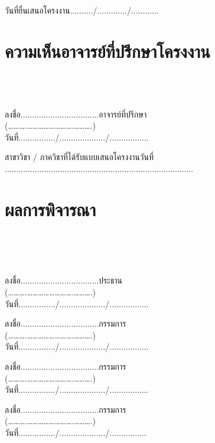 \documentclass[12pt,a4paper]{article}
\begin{document}
\vspace{1cm}
วันที่ยื่นเสนอโครงงาน........../............./............

\vspace{2cm}

\section*{ความเห็นอาจารย์ที่ปรึกษาโครงงาน}
\dotfill\\
\dotfill\\
\dotfill\\

\vspace{1cm}
ลงชื่อ..................................อาจารย์ที่ปรึกษา\\
(……….…………………….……….)\\
วันที่................/..................../.................

\vspace{1cm}
สาขาวิชา / ภาควิชาที่ได้รับแบบเสนอโครงงานวันที่ ..................................................................................

\vspace{1cm}

\section*{ผลการพิจารณา}
\dotfill\\
\dotfill\\
\dotfill\\

\vspace{1cm}

\begin{minipage}{0.5\textwidth}
ลงชื่อ..................................ประธาน\\
(……….…………………….……….)\\
วันที่................/..................../.................

\vspace{1cm}

ลงชื่อ..................................กรรมการ\\
(……….…………………….……….)\\
วันที่................/..................../.................
\end{minipage}
\begin{minipage}{0.5\textwidth}
ลงชื่อ..................................กรรมการ\\
(……….…………………….……….)\\
วันที่................/..................../.................

\vspace{1cm}

ลงชื่อ..................................กรรมการ\\
(……….…………………….……….)\\
วันที่................/..................../................
\end{minipage}
\end{document}
